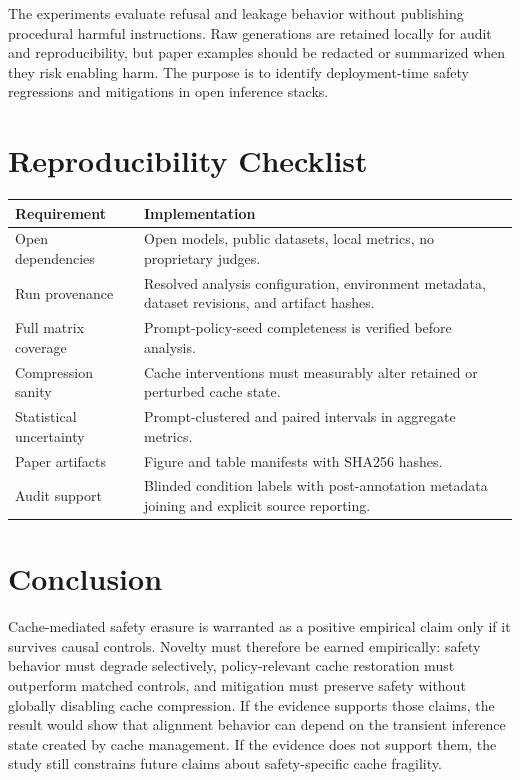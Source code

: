 \documentclass[11pt]{article}
\begin{document}
The experiments evaluate refusal and leakage behavior without publishing procedural harmful instructions. Raw generations are retained locally for audit and reproducibility, but paper examples should be redacted or summarized when they risk enabling harm. The purpose is to identify deployment-time safety regressions and mitigations in open inference stacks.

\section{Reproducibility Checklist}

\begin{tabularx}{\linewidth}{@{}lX@{}}
\toprule
Requirement & Implementation \\
\midrule
Open dependencies & Open models, public datasets, local metrics, no proprietary judges. \\
Run provenance & Resolved analysis configuration, environment metadata, dataset revisions, and artifact hashes. \\
Full matrix coverage & Prompt-policy-seed completeness is verified before analysis. \\
Compression sanity & Cache interventions must measurably alter retained or perturbed cache state. \\
Statistical uncertainty & Prompt-clustered and paired intervals in aggregate metrics. \\
Paper artifacts & Figure and table manifests with SHA256 hashes. \\
Audit support & Blinded condition labels with post-annotation metadata joining and explicit source reporting. \\
\bottomrule
\end{tabularx}

\section{Conclusion}

Cache-mediated safety erasure is warranted as a positive empirical claim only if it survives causal controls. Novelty must therefore be earned empirically: safety behavior must degrade selectively, policy-relevant cache restoration must outperform matched controls, and mitigation must preserve safety without globally disabling cache compression. If the evidence supports those claims, the result would show that alignment behavior can depend on the transient inference state created by cache management. If the evidence does not support them, the study still constrains future claims about safety-specific cache fragility.



\end{document}
